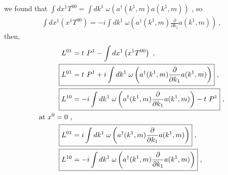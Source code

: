\documentclass[12pt,a4paper]{report}
\begin{document}
we found that $\int dx^1 T^{00}=\int dk^1 \;\omega\left (a^{\dagger}(k^1,m)a(k^1,m)\right)$ , so
  \begin{align}
      \int dx^1\left(x^1 T^{00} \right)=-i\int dk^1 \;\omega\left (a^{\dagger}(k^1,m)\frac{\partial}{\partial k_1}a(k^1,m)\right)~,
  \end{align}
  then,
   \begin{align}
     L^{01}&=t~ P^1-\int dx^1\left(x^1 T^{00} \right)~,\nonumber\\
     \Aboxed{L^{01}&=t~P^1+i\int dk^1 \;\omega\left (a^{\dagger}(k^1,m)\frac{\partial}{\partial k_1}a(k^1,m)\right)} ~, \\
     \Aboxed{L^{10}&=-i\int dk^1 \;\omega\left (a^{\dagger}(k^1,m)\frac{\partial}{\partial k_1}a(k^1,m)\right)-t~P^1} ~,\\
     \text{at $x^0=0$~,}&\nonumber\\
     \Aboxed{L^{01}&=i\int dk^1 \;\omega\left (a^{\dagger}(k^1,m)\frac{\partial}{\partial k_1}a(k^1,m)\right)} ~, \\
     \Aboxed{L^{10}&=-i\int dk^1 \;\omega\left (a^{\dagger}(k^1,m)\frac{\partial}{\partial k_1}a(k^1,m)\right)}~,
   \end{align}
\end{document}
